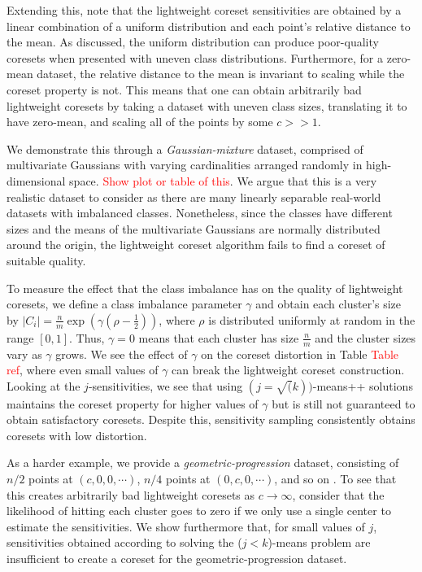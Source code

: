 Extending this, note that the lightweight coreset sensitivities are obtained by a linear combination of a uniform distribution and each point's relative
distance to the mean. As discussed, the uniform distribution can produce poor-quality coresets when presented with uneven class distributions. Furthermore, for
a zero-mean dataset, the relative distance to the mean is invariant to scaling while the coreset property is not. This means that one can obtain arbitrarily
bad lightweight coresets by taking a dataset with uneven class sizes, translating it to have zero-mean, and scaling all of the points by some $c >> 1$.

We demonstrate this through a \emph{Gaussian-mixture} dataset, comprised of multivariate Gaussians with varying cardinalities arranged randomly in
high-dimensional space. \textcolor{red}{Show plot or table of this}. We argue that this is a very realistic dataset to consider as there are many linearly
separable real-world datasets with imbalanced classes. Nonetheless, since the classes have different sizes and the means of the multivariate Gaussians are
normally distributed around the origin, the lightweight coreset algorithm fails to find a coreset of suitable quality. 

To measure the effect that the class imbalance has on the quality of lightweight coresets, we define a class imbalance parameter $\gamma$ and obtain each
cluster's size by $|C_i| = \frac{n}{m} \exp \left( \gamma(\rho - \frac{1}{2}) \right)$, where $\rho$ is distributed uniformly at random in the range $[0, 1]$.
Thus, $\gamma = 0$ means that each cluster has size $\frac{n}{m}$ and the cluster sizes vary as $\gamma$ grows. We see the effect of $\gamma$ on the coreset
distortion in Table \textcolor{red}{Table ref}, where even small values of $\gamma$ can break the lightweight coreset construction. Looking at the
$j$-sensitivities, we see that using $(j=\sqrt(k))$-means++ solutions maintains the coreset property for higher values of $\gamma$ but is still not guaranteed
to obtain satisfactory coresets. Despite this, sensitivity sampling consistently obtains coresets with low distortion.

As a harder example, we provide a \emph{geometric-progression} dataset, consisting of $n/2$ points at $(c, 0, 0, \cdots)$, $n/4$ points at $(0, c, 0, \cdots)$,
and so on . To see that this creates arbitrarily bad lightweight coresets as $c \rightarrow \infty$, consider that the likelihood of hitting each cluster goes to
zero if we only use a single center to estimate the sensitivities. We show furthermore that, for small values of $j$, sensitivities obtained
according to solving the ($j<k$)-means problem are insufficient to create a coreset for the geometric-progression dataset.

